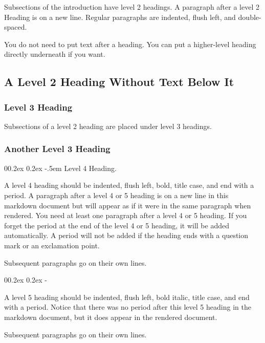 \documentclass[
  man,
  floatsintext,
  longtable,
  colorlinks=true,linkcolor=blue,citecolor=blue,urlcolor=blue]{apa7}
\makeatletter
\renewcommand{\paragraph}{\@startsection{paragraph}{4}{\parindent}%
	{0\baselineskip \@plus 0.2ex \@minus 0.2ex}%
	{-.5em}%
	{\normalfont\normalsize\bfseries\typesectitle}}
\renewcommand{\subparagraph}[1]{\@startsection{subparagraph}{5}{0.5em}%
	{0\baselineskip \@plus 0.2ex \@minus 0.2ex}%
	{-\z@\relax}%
	{\normalfont\normalsize\bfseries\itshape\hspace{\parindent}{#1}\textit{\addperi}}{\relax}}
\makeatother
\begin{document}
Subsections of the introduction have level 2 headings. A paragraph after
a level 2 Heading is on a new line. Regular paragraphs are indented,
flush left, and double-spaced.

You do not need to put text after a heading. You can put a higher-level
heading directly underneath if you want.

\subsection{A Level 2 Heading Without Text Below
It}\label{a-level-2-heading-without-text-below-it}

\subsubsection{Level 3 Heading}\label{level-3-heading}

Subsections of a level 2 heading are placed under level 3 headings.

\subsubsection{Another Level 3 Heading}\label{another-level-3-heading}

\paragraph{Level 4 Heading.}\label{level-4-heading}

A level 4 heading should be indented, flush left, bold, title case, and
end with a period. A paragraph after a level 4 or 5 heading is on a new
line in this markdown document but will appear as if it were in the same
paragraph when rendered. You need at least one paragraph after a level 4
or 5 heading. If you forget the period at the end of the level 4 or 5
heading, it will be added automatically. A period will not be added if
the heading ends with a question mark or an exclamation point.

Subsequent paragraphs go on their own lines.

\subparagraph{Level 5 Heading.}\label{level-5-heading}

A level 5 heading should be indented, flush left, bold italic, title
case, and end with a period. Notice that there was no period after this
level 5 heading in the markdown document, but it does appear in the
rendered document.

Subsequent paragraphs go on their own lines.
\end{document}
